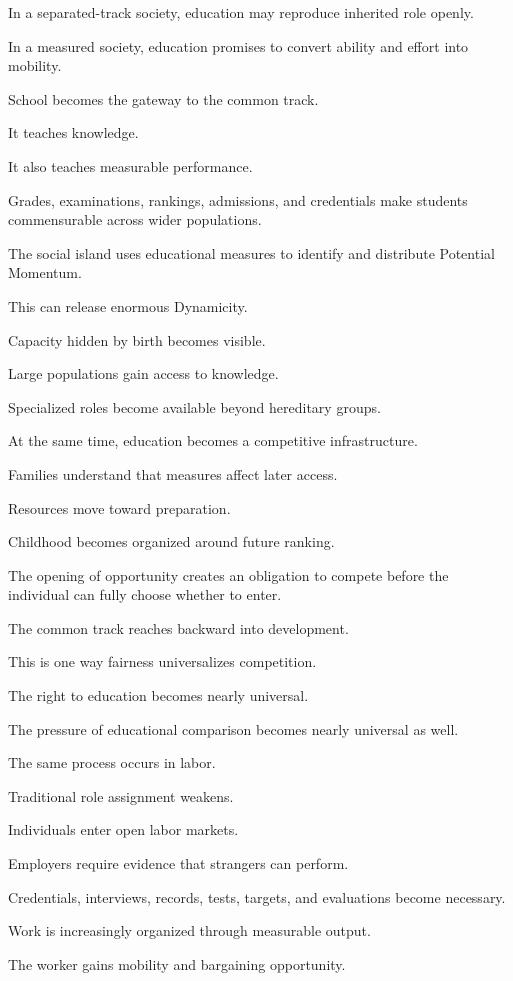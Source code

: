 In a separated-track society, education may reproduce inherited role openly.

In a measured society, education promises to convert ability and effort into mobility.

School becomes the gateway to the common track.

It teaches knowledge.

It also teaches measurable performance.

Grades, examinations, rankings, admissions, and credentials make students commensurable across wider populations.

The social island uses educational measures to identify and distribute Potential Momentum.

This can release enormous Dynamicity.

Capacity hidden by birth becomes visible.

Large populations gain access to knowledge.

Specialized roles become available beyond hereditary groups.

At the same time, education becomes a competitive infrastructure.

Families understand that measures affect later access.

Resources move toward preparation.

Childhood becomes organized around future ranking.

The opening of opportunity creates an obligation to compete before the individual can fully choose whether to enter.

The common track reaches backward into development.

This is one way fairness universalizes competition.

The right to education becomes nearly universal.

The pressure of educational comparison becomes nearly universal as well.

The same process occurs in labor.

Traditional role assignment weakens.

Individuals enter open labor markets.

Employers require evidence that strangers can perform.

Credentials, interviews, records, tests, targets, and evaluations become necessary.

Work is increasingly organized through measurable output.

The worker gains mobility and bargaining opportunity.

